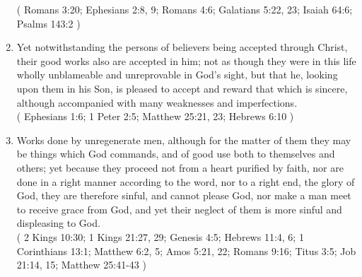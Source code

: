 \documentclass[12pt,a4paper]{book}
\begin{document}
\begin{enumerate}
( Romans 3:20; Ephesians 2:8, 9; Romans 4:6; Galatians 5:22, 23; Isaiah 64:6; Psalms 143:2 )
\item Yet notwithstanding the persons of believers being accepted through Christ, their good works also are accepted in him; not as though they were in this life wholly unblameable and unreprovable in God's sight, but that he, looking upon them in his Son, is pleased to accept and reward that which is sincere, although accompanied with many weaknesses and imperfections.\\
( Ephesians 1:6; 1 Peter 2:5; Matthew 25:21, 23; Hebrews 6:10 )
\item Works done by unregenerate men, although for the matter of them they may be things which God commands, and of good use both to themselves and others; yet because they proceed not from a heart purified by faith, nor are done in a right manner according to the word, nor to a right end, the glory of God, they are therefore sinful, and cannot please God, nor make a man meet to receive grace from God, and yet their neglect of them is more sinful and displeasing to God.\\
( 2 Kings 10:30; 1 Kings 21:27, 29; Genesis 4:5; Hebrews 11:4, 6; 1 Corinthians 13:1; Matthew 6:2, 5; Amos 5:21, 22; Romans 9:16; Titus 3:5; Job 21:14, 15; Matthew 25:41-43 )
\end{enumerate}
\end{document}
